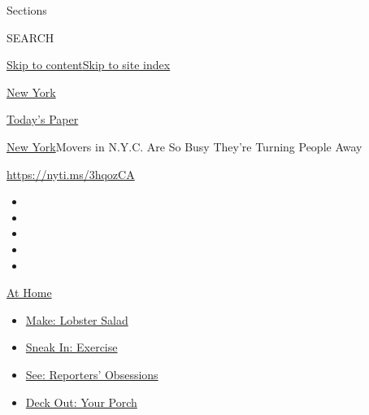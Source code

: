 Sections

SEARCH

\protect\hyperlink{site-content}{Skip to
content}\protect\hyperlink{site-index}{Skip to site index}

\href{https://www.nytimes3xbfgragh.onion/section/nyregion}{New York}

\href{https://myaccount.nytimes3xbfgragh.onion/auth/login?response_type=cookie\&client_id=vi}{}

\href{https://www.nytimes3xbfgragh.onion/section/todayspaper}{Today's
Paper}

\href{/section/nyregion}{New York}\textbar{}Movers in N.Y.C. Are So Busy
They're Turning People Away

\url{https://nyti.ms/3hqozCA}

\begin{itemize}
\item
\item
\item
\item
\item
\end{itemize}

\href{https://www.nytimes3xbfgragh.onion/spotlight/at-home?action=click\&pgtype=Article\&state=default\&region=TOP_BANNER\&context=at_home_menu}{At
Home}

\begin{itemize}
\tightlist
\item
  \href{https://www.nytimes3xbfgragh.onion/2020/08/14/dining/lobster-salad-recipe.html?action=click\&pgtype=Article\&state=default\&region=TOP_BANNER\&context=at_home_menu}{Make:
  Lobster Salad}
\item
  \href{https://www.nytimes3xbfgragh.onion/2020/08/15/at-home/coronavirus-at-home-quick-exercises.html?action=click\&pgtype=Article\&state=default\&region=TOP_BANNER\&context=at_home_menu}{Sneak
  In: Exercise}
\item
  \href{https://www.nytimes3xbfgragh.onion/interactive/2020/at-home/even-more-reporters-editors-diaries-lists-recommendations.html?action=click\&pgtype=Article\&state=default\&region=TOP_BANNER\&context=at_home_menu}{See:
  Reporters' Obsessions}
\item
  \href{https://www.nytimes3xbfgragh.onion/2020/08/15/at-home/coronavirus-fall-patio-furniture.html?action=click\&pgtype=Article\&state=default\&region=TOP_BANNER\&context=at_home_menu}{Deck
  Out: Your Porch}
\end{itemize}

